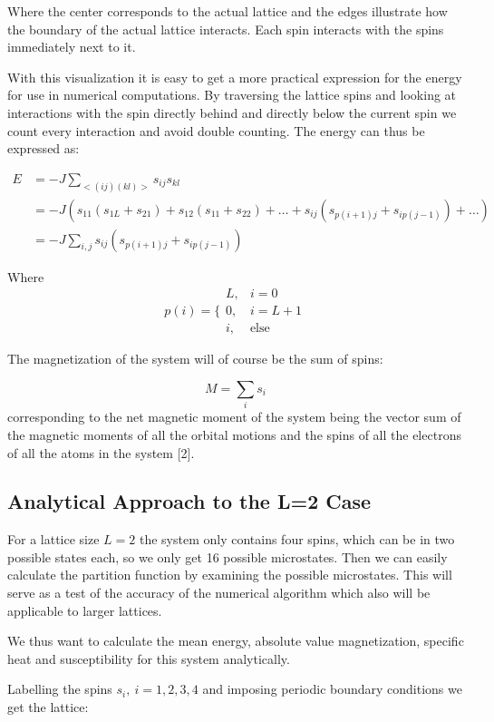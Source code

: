 \documentclass[english, 12pt]{article}
\begin{document}
Where the center corresponds to the actual lattice and the edges illustrate how the boundary of the actual lattice interacts. Each spin interacts with the spins immediately next to it.

With this visualization it is easy to get a more practical expression for the energy for use in numerical computations. By traversing the lattice spins and looking at interactions with the spin directly behind and directly below the current spin we count every interaction and avoid double counting. The energy can thus be expressed as:

\begin{align*}
 E &= -J\sum\limits_{<(ij)(kl)>}s_{ij}s_{kl}\\
 &= -J\left(s_{11}(s_{1L}+s_{21}) + s_{12}(s_{11}+s_{22}) + \dots +s_{ij}(s_{p(i+1)j} +s_{ip(j-1)})+\dots\right) \\
 &= -J\sum\limits_{i,j} s_{ij}(s_{p(i+1)j} +s_{ip(j-1)})
\end{align*}

Where
$$p(i) = \Bigg\{ \begin{matrix}
L, & i=0 \\ 0, & i=L+1 \\  i, & \text{else} \end{matrix}$$

The magnetization of the system will of course be the sum of spins:

$$M = \sum\limits_i s_i$$
corresponding to the net magnetic moment of the system being the vector sum of the magnetic moments of all the orbital motions and the spins of all the electrons of all the atoms in the system [2].

\subsection{Analytical Approach to the L=2 Case}
For a lattice size $L=2$ the system only contains four spins, which can be in two possible states each, so we only get 16 possible microstates. Then we can easily calculate the partition function by examining the possible microstates. This will serve as a test of the accuracy of the numerical algorithm which also will be applicable to larger lattices.

We thus want to calculate the mean energy, absolute value magnetization, specific heat and susceptibility for this system analytically.

Labelling the spins $s_i,\ i= 1,2,3,4 $ and imposing periodic boundary conditions we get the lattice:
\end{document}
